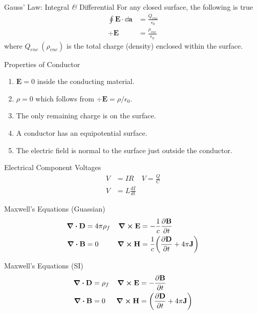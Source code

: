 \documentclass[avery5371,grid]{flashcards}
\begin{document}
\begin{flashcard}[Definition]{Gauss' Law: Integral \textit{\&} Differential}
	For any closed surface, the following is true
	\begin{align*}
		\oint\mathbf{E}\cdot\dd\mathbf{a} &= \frac{Q_{enc}}{\epsilon_0}\\
		\div\mathbf{E} &= \frac{\rho_{enc}}{\epsilon_0}
	\end{align*}
	where $Q_{enc}\ (\rho_{enc})$ is the total charge (density) enclosed within the surface. 
\end{flashcard}

\begin{flashcard}[Theory]{Properties of Conductor}
	\begin{enumerate}[label=(\itshape\roman*)]
		\item $\mathbf{E}=0$ inside the conducting material.
		\item $\rho=0$ which follows from $\div\mathbf{E}=\rho/\epsilon_0$.
		\item The only remaining charge is on the surface.
		\item A conductor has an equipotential surface.
		\item The electric field is normal to the surface just outside the conductor.
	\end{enumerate}
\end{flashcard}

\begin{flashcard}[Theory]{Electrical Component Voltages}
	\begin{align*}
		V &= IR		&	V = \frac{Q}{C} \\
		V &= L\frac{dI}{dt}
	\end{align*}
\end{flashcard}

\begin{flashcard}[Definition]{Maxwell's Equations (Guassian)}
	\begin{align*}
		\div\mathbf{D} &= 4\pi\rho_f
			& \curl \mathbf{E} &= -\frac{1}{c} \pdv{\mathbf{B}}{t}
		\\
		\div\mathbf{B} &= 0
			& \curl \mathbf{H} &= \frac{1}{c}\qty( \pdv{\mathbf{D}}{t} + 4\pi \mathbf{J} )
	\end{align*}
\end{flashcard}

\begin{flashcard}[Definition]{Maxwell's Equations (SI)}
	\begin{align*}
		\div\mathbf{D} &= \rho_f
			& \curl \mathbf{E} &= -\pdv{\mathbf{B}}{t}
		\\
		\div\mathbf{B} &= 0
			& \curl \mathbf{H} &= \qty( \pdv{\mathbf{D}}{t} + 4\pi \mathbf{J} )
	\end{align*}
\end{flashcard}
\end{document}
